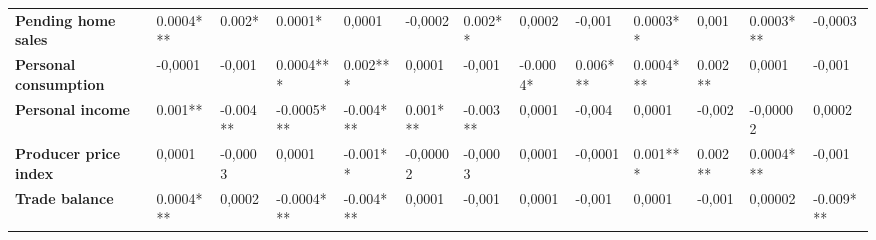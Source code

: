 \begin{landscape}
\begin{table}[]
{\begin{tabular}{@{}lllllllllllll@{}}
\textbf{Pending home sales}       & 0.0004***                             & 0.002*                                & 0.0001*                               & 0,0001                                & -0,0002                               & 0.002**                               & 0,0002                                & -0,001                                & 0.0003**                              & 0,001                                 & 0.0003***                             & -0,0003                               \\
\textbf{Personal consumption}     & -0,0001                               & -0,001                                & 0.0004***                             & 0.002***                              & 0,0001                                & -0,001                                & -0.0004*                              & 0.006***                              & 0.0004***                             & 0.002**                               & 0,0001                                & -0,001                                \\
\textbf{Personal income}          & 0.001**                               & -0.004**                              & -0.0005***                            & -0.004***                             & 0.001***                              & -0.003**                              & 0,0001                                & -0,004                                & 0,0001                                & -0,002                                & -0,00002                              & 0,0002                                \\
\textbf{Producer price index}     & 0,0001                                & -0,0003                               & 0,0001                                & -0.001**                              & -0,00002                              & -0,0003                               & 0,0001                                & -0,0001                               & 0.001***                              & 0.002**                               & 0.0004***                             & -0,001                                \\
\textbf{Trade balance}            & 0.0004***                             & 0,0002                                & -0.0004***                            & -0.004***                             & 0,0001                                & -0,001                                & 0,0001                                & -0,001                                & 0,0001                                & -0,001                                & 0,00002                               & -0.009***                             \\ \bottomrule
\end{tabular}%
}


\end{table}
\end{landscape}
